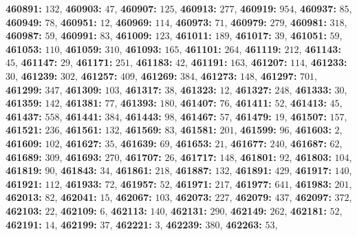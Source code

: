 \textsf{\bfseries 460891:} $132$, \textsf{\bfseries 460903:} $47$, \textsf{\bfseries 460907:} $125$, \textsf{\bfseries 460913:} $277$, \textsf{\bfseries 460919:} $954$, \textsf{\bfseries 460937:} $85$, \textsf{\bfseries 460949:} $78$, \textsf{\bfseries 460951:} $12$, \textsf{\bfseries 460969:} $114$, \textsf{\bfseries 460973:} $71$, \textsf{\bfseries 460979:} $279$, \textsf{\bfseries 460981:} $318$, \textsf{\bfseries 460987:} $59$, \textsf{\bfseries 460991:} $83$, \textsf{\bfseries 461009:} $123$, \textsf{\bfseries 461011:} $189$, \textsf{\bfseries 461017:} $39$, \textsf{\bfseries 461051:} $59$, \textsf{\bfseries 461053:} $110$, \textsf{\bfseries 461059:} $310$, \textsf{\bfseries 461093:} $165$, \textsf{\bfseries 461101:} $264$, \textsf{\bfseries 461119:} $212$, \textsf{\bfseries 461143:} $45$, \textsf{\bfseries 461147:} $29$, \textsf{\bfseries 461171:} $251$, \textsf{\bfseries 461183:} $42$, \textsf{\bfseries 461191:} $163$, \textsf{\bfseries 461207:} $114$, \textsf{\bfseries 461233:} $30$, \textsf{\bfseries 461239:} $302$, \textsf{\bfseries 461257:} $409$, \textsf{\bfseries 461269:} $384$, \textsf{\bfseries 461273:} $148$, \textsf{\bfseries 461297:} $701$, \textsf{\bfseries 461299:} $347$, \textsf{\bfseries 461309:} $103$, \textsf{\bfseries 461317:} $38$, \textsf{\bfseries 461323:} $12$, \textsf{\bfseries 461327:} $248$, \textsf{\bfseries 461333:} $30$, \textsf{\bfseries 461359:} $142$, \textsf{\bfseries 461381:} $77$, \textsf{\bfseries 461393:} $180$, \textsf{\bfseries 461407:} $76$, \textsf{\bfseries 461411:} $52$, \textsf{\bfseries 461413:} $45$, \textsf{\bfseries 461437:} $558$, \textsf{\bfseries 461441:} $384$, \textsf{\bfseries 461443:} $98$, \textsf{\bfseries 461467:} $57$, \textsf{\bfseries 461479:} $19$, \textsf{\bfseries 461507:} $157$, \textsf{\bfseries 461521:} $236$, \textsf{\bfseries 461561:} $132$, \textsf{\bfseries 461569:} $83$, \textsf{\bfseries 461581:} $201$, \textsf{\bfseries 461599:} $96$, \textsf{\bfseries 461603:} $2$, \textsf{\bfseries 461609:} $102$, \textsf{\bfseries 461627:} $35$, \textsf{\bfseries 461639:} $69$, \textsf{\bfseries 461653:} $21$, \textsf{\bfseries 461677:} $240$, \textsf{\bfseries 461687:} $62$, \textsf{\bfseries 461689:} $309$, \textsf{\bfseries 461693:} $270$, \textsf{\bfseries 461707:} $26$, \textsf{\bfseries 461717:} $148$, \textsf{\bfseries 461801:} $92$, \textsf{\bfseries 461803:} $104$, \textsf{\bfseries 461819:} $90$, \textsf{\bfseries 461843:} $34$, \textsf{\bfseries 461861:} $218$, \textsf{\bfseries 461887:} $132$, \textsf{\bfseries 461891:} $429$, \textsf{\bfseries 461917:} $140$, \textsf{\bfseries 461921:} $112$, \textsf{\bfseries 461933:} $72$, \textsf{\bfseries 461957:} $52$, \textsf{\bfseries 461971:} $217$, \textsf{\bfseries 461977:} $641$, \textsf{\bfseries 461983:} $201$, \textsf{\bfseries 462013:} $82$, \textsf{\bfseries 462041:} $15$, \textsf{\bfseries 462067:} $103$, \textsf{\bfseries 462073:} $227$, \textsf{\bfseries 462079:} $437$, \textsf{\bfseries 462097:} $372$, \textsf{\bfseries 462103:} $22$, \textsf{\bfseries 462109:} $6$, \textsf{\bfseries 462113:} $140$, \textsf{\bfseries 462131:} $290$, \textsf{\bfseries 462149:} $262$, \textsf{\bfseries 462181:} $52$, \textsf{\bfseries 462191:} $14$, \textsf{\bfseries 462199:} $37$, \textsf{\bfseries 462221:} $3$, \textsf{\bfseries 462239:} $380$, \textsf{\bfseries 462263:} $53$, 
